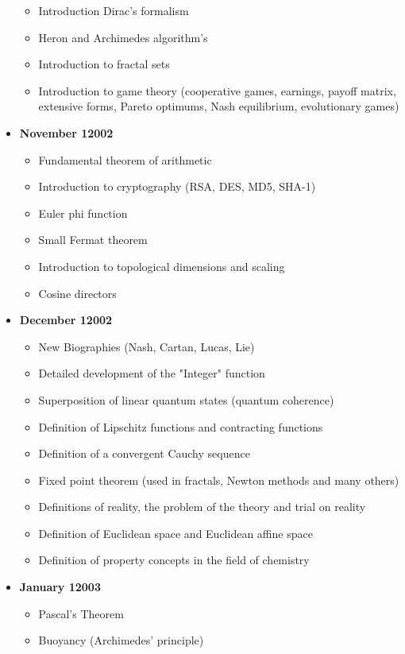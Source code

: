 \begin{itemize}
\begin{itemize}[noitemsep]
				\item Introduction Dirac's formalism
				\item Heron and Archimedes algorithm's
				\item Introduction to fractal sets
				\item Introduction to game theory (cooperative games, earnings, payoff matrix, extensive forms, Pareto optimums, Nash equilibrium, evolutionary games)
			\end{itemize}
		\item \textbf{November 12002}
			\begin{itemize}[noitemsep]
			\item Fundamental theorem of arithmetic
			\item Introduction to cryptography (RSA, DES, MD5, SHA-1)
			\item Euler phi function
			\item Small Fermat theorem
			\item Introduction to topological dimensions and scaling 
			\item Cosine directors
		\end{itemize}
		\item \textbf{December 12002}
			\begin{itemize}[noitemsep]
			\item New Biographies (Nash, Cartan, Lucas, Lie)
			\item Detailed development of the "Integer" function
			\item Superposition of linear quantum states (quantum coherence) 
			\item Definition of Lipschitz functions and contracting functions 
			\item Definition of a convergent Cauchy sequence 
			\item Fixed point theorem (used in fractals, Newton methods and many others)
			\item Definitions of reality, the problem of the theory and trial on reality
			\item Definition of Euclidean space and Euclidean affine space
			\item Definition of property concepts in the field of chemistry
		\end{itemize}
		\item \textbf{January 12003}
		\begin{itemize}[noitemsep]
			\item Pascal's Theorem
			\item Buoyancy (Archimedes' principle)

\end{itemize}
\end{itemize}
